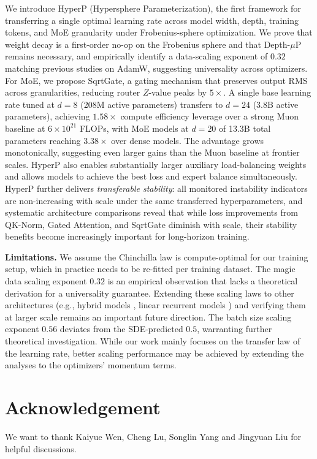 \documentclass{article}
\begin{document}
We introduce HyperP (Hypersphere Parameterization), the first framework for transferring a single optimal learning rate across model width, depth, training tokens, and MoE granularity under Frobenius-sphere optimization. We prove that weight decay is a first-order no-op on the Frobenius sphere and that Depth-$\mu$P remains necessary, and empirically identify a data-scaling exponent of $0.32$ matching previous studies on AdamW, suggesting universality across optimizers. For MoE, we propose SqrtGate, a gating mechanism that preserves output RMS across granularities, reducing router $Z$-value peaks by $5\times$. A single base learning rate tuned at $d{=}8$ (208M active parameters) transfers to $d{=}24$ (3.8B active parameters), achieving $1.58\times$ compute efficiency leverage over a strong Muon baseline at $6\times 10^{21}$ FLOPs, with MoE models at $d{=}20$ of 13.3B total parameters reaching $3.38\times$ over dense models. The advantage grows monotonically, suggesting even larger gains than the Muon baseline at frontier scales. HyperP also enables substantially larger auxiliary load-balancing weights and allows models to achieve the best loss and expert balance simultaneously. HyperP further delivers \emph{transferable stability}: all monitored instability indicators are non-increasing with scale under the same transferred hyperparameters, and systematic architecture comparisons reveal that while loss improvements from QK-Norm, Gated Attention, and SqrtGate diminish with scale, their stability benefits become increasingly important for long-horizon training.

\textbf{Limitations.} We assume the Chinchilla law is compute-optimal for our training setup, which in practice needs to be re-fitted per training dataset. The magic data scaling exponent $0.32$ is an empirical observation that lacks a theoretical derivation for a universality guarantee. Extending these scaling laws to other architectures (e.g., hybrid models \cite{ren2025decoderhybriddecoder}, linear recurrent models \cite{lahoti2026mamba030,yang2025gated}) and verifying them at larger scale remains an important future direction. The batch size scaling exponent $0.56$ deviates from the SDE-predicted $0.5$, warranting further theoretical investigation. While our work mainly focuses on the transfer law of the learning rate, better scaling performance may be achieved by extending the analyses to the optimizers' momentum terms.


\section*{Acknowledgement}
We want to thank Kaiyue Wen, Cheng Lu, Songlin Yang and Jingyuan Liu for helpful discussions.
\end{document}
